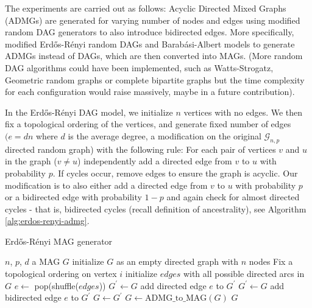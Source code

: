 \documentclass[a4paper]{article}
\begin{document}
The experiments are carried out as follows: Acyclic Directed Mixed Graphs (ADMGs) are generated for varying number of nodes and edges using modified random DAG generators to also introduce bidirected edges. More specifically, modified Erd\H{o}s-R\'{e}nyi random DAGs \cite{erdos1959} and Barab\'{a}si-Albert models \cite{barabasi1999} to generate ADMGs instead of DAGs, which are then converted into MAGs. (More random DAG algorithms could have been implemented, such as Watts-Strogatz, Geometric random graphs or complete bipartite graphs but the time complexity for each configuration would raise massively, maybe in a future contribution).

In the Erd\H{o}s-R\'{e}nyi DAG model, we initialize $n$ vertices with no edges. We then fix a topological ordering of the vertices, and generate fixed number of edges $(e=dn$ where $d$ is the average degree, a modification on the original $\mathcal{G}_{n,p}$ directed random graph) with the following rule: For each pair of vertices  $v$ and $u$ in the graph ($v \neq u$) independently add a directed edge from $v$ to $u$ with probability $p$. If cycles occur, remove edges to ensure the graph is acyclic. Our modification is to also either add a directed edge from $v$ to $u$ with probability $p$ or a bidirected edge with probability $1-p$ and again check for almost directed cycles - that is, bidirected cycles (recall definition of ancestrality), see Algorithm \ref{alg:erdos-renyi-admg}.

\begin{algorithm}
	\caption{Erdős-Rényi MAG generator}
	\label{alg:erdos-renyi-admg}
	\begin{algorithmic}[1]
		\renewcommand{\algorithmicrequire}{\textbf{Input:}}
		\renewcommand{\algorithmicensure}{\textbf{Output:}}
		\Require $n$, $p$, $d$
		\Ensure  a MAG $G$
		\State initialize $G$ as an empty directed graph with $n$ nodes
			\State Fix a topological ordering on vertex $i$
			\EndFor
		\State initialize $edges$ with all possible directed arcs in $G$
		\State $e \leftarrow$ pop(shuffle($edges$))
		\State $G^{'} \leftarrow G$ 
		\State add directed edge $e$ to $G^{'}$
		\Else
		\State $G^{'} \leftarrow G$ 
		\State add bidirected edge $e$ to $G^{'}$
		\EndIf
		\State $G \leftarrow G^{'}$ 
		\EndIf
		\EndWhile
		\State $G \leftarrow \text{ADMG\_to\_MAG}(G)$
		\State \Return $G$ 
	\end{algorithmic} 
\end{algorithm}
\end{document}

